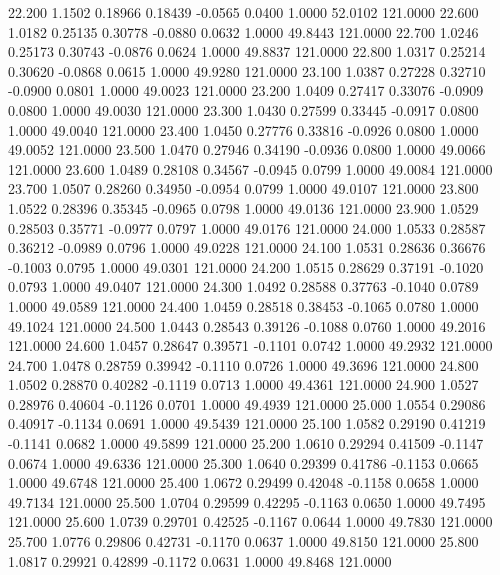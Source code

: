   22.200   1.1502   0.18966   0.18439  -0.0565   0.0400   1.0000  52.0102 121.0000
  22.600   1.0182   0.25135   0.30778  -0.0880   0.0632   1.0000  49.8443 121.0000
  22.700   1.0246   0.25173   0.30743  -0.0876   0.0624   1.0000  49.8837 121.0000
  22.800   1.0317   0.25214   0.30620  -0.0868   0.0615   1.0000  49.9280 121.0000
  23.100   1.0387   0.27228   0.32710  -0.0900   0.0801   1.0000  49.0023 121.0000
  23.200   1.0409   0.27417   0.33076  -0.0909   0.0800   1.0000  49.0030 121.0000
  23.300   1.0430   0.27599   0.33445  -0.0917   0.0800   1.0000  49.0040 121.0000
  23.400   1.0450   0.27776   0.33816  -0.0926   0.0800   1.0000  49.0052 121.0000
  23.500   1.0470   0.27946   0.34190  -0.0936   0.0800   1.0000  49.0066 121.0000
  23.600   1.0489   0.28108   0.34567  -0.0945   0.0799   1.0000  49.0084 121.0000
  23.700   1.0507   0.28260   0.34950  -0.0954   0.0799   1.0000  49.0107 121.0000
  23.800   1.0522   0.28396   0.35345  -0.0965   0.0798   1.0000  49.0136 121.0000
  23.900   1.0529   0.28503   0.35771  -0.0977   0.0797   1.0000  49.0176 121.0000
  24.000   1.0533   0.28587   0.36212  -0.0989   0.0796   1.0000  49.0228 121.0000
  24.100   1.0531   0.28636   0.36676  -0.1003   0.0795   1.0000  49.0301 121.0000
  24.200   1.0515   0.28629   0.37191  -0.1020   0.0793   1.0000  49.0407 121.0000
  24.300   1.0492   0.28588   0.37763  -0.1040   0.0789   1.0000  49.0589 121.0000
  24.400   1.0459   0.28518   0.38453  -0.1065   0.0780   1.0000  49.1024 121.0000
  24.500   1.0443   0.28543   0.39126  -0.1088   0.0760   1.0000  49.2016 121.0000
  24.600   1.0457   0.28647   0.39571  -0.1101   0.0742   1.0000  49.2932 121.0000
  24.700   1.0478   0.28759   0.39942  -0.1110   0.0726   1.0000  49.3696 121.0000
  24.800   1.0502   0.28870   0.40282  -0.1119   0.0713   1.0000  49.4361 121.0000
  24.900   1.0527   0.28976   0.40604  -0.1126   0.0701   1.0000  49.4939 121.0000
  25.000   1.0554   0.29086   0.40917  -0.1134   0.0691   1.0000  49.5439 121.0000
  25.100   1.0582   0.29190   0.41219  -0.1141   0.0682   1.0000  49.5899 121.0000
  25.200   1.0610   0.29294   0.41509  -0.1147   0.0674   1.0000  49.6336 121.0000
  25.300   1.0640   0.29399   0.41786  -0.1153   0.0665   1.0000  49.6748 121.0000
  25.400   1.0672   0.29499   0.42048  -0.1158   0.0658   1.0000  49.7134 121.0000
  25.500   1.0704   0.29599   0.42295  -0.1163   0.0650   1.0000  49.7495 121.0000
  25.600   1.0739   0.29701   0.42525  -0.1167   0.0644   1.0000  49.7830 121.0000
  25.700   1.0776   0.29806   0.42731  -0.1170   0.0637   1.0000  49.8150 121.0000
  25.800   1.0817   0.29921   0.42899  -0.1172   0.0631   1.0000  49.8468 121.0000
